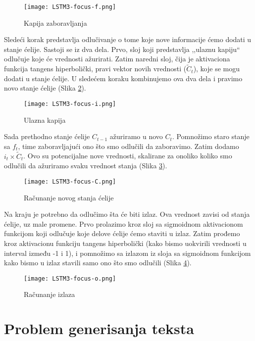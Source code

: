 \documentclass[a4paper]{article}
\begin{document}
\begin{figure}[htp]
    \centering
    \texttt{[image: LSTM3-focus-f.png]}
    \caption{Kapija zaboravljanja}
    \label{fig:lstm6}
\end{figure}

Sledeći korak predstavlja odlučivanje o tome koje nove informacije ćemo dodati u stanje ćelije. Sastoji se iz dva dela. Prvo, sloj koji predstavlja ,,ulaznu kapiju`` odlučuje koje će vrednosti ažurirati. Zatim naredni sloj, čija je aktivaciona funkcija tangens hiperbolički, pravi vektor novih vrednosti ($\tilde{C}_t$), koje se mogu dodati u stanje ćelije. U sledećem koraku kombinujemo ova dva dela i pravimo novo stanje ćelije (Slika \ref{fig:lstm7}).

\begin{figure}[htp]
    \centering
    \texttt{[image: LSTM3-focus-i.png]}
    \caption{Ulazna kapija}
    \label{fig:lstm7}
\end{figure}


Sada prethodno stanje ćelije $C_{t-1}$ ažuriramo u novo $C_t$.  Pomnožimo staro stanje sa $f_t$, time zaboravljajući ono što smo odlučili da zaboravimo. Zatim dodamo $i_t \times \tilde{C}_t$. Ovo su potencijalne nove vrednosti, skalirane za onoliko koliko smo odlučili da ažuriramo svaku vrednost stanja (Slika \ref{fig:lstm8}). 

\begin{figure}[htp]
    \centering
    \texttt{[image: LSTM3-focus-C.png]}
    \caption{Računanje novog stanja ćelije}
    \label{fig:lstm8}
\end{figure}


Na kraju je potrebno da odlučimo šta će biti izlaz. Ova vrednost zavisi od stanja ćelije, uz male promene. Prvo prolazimo kroz sloj sa sigmoidnom aktivacionom funkcijom koji odlučuje koje delove ćelije ćemo staviti u izlaz. Zatim prođemo kroz aktivacionu funkciju tangens hiperbolički (kako bismo uokvirili vrednosti u interval između -1 i 1), i pomnožimo sa izlazom iz sloja sa sigmoidnom funkcijom kako bismo u izlaz stavili samo ono što smo odlučili (Slika \ref{fig:lstm9}).

\begin{figure}[htp]
    \centering
    \texttt{[image: LSTM3-focus-o.png]}
    \caption{Računanje izlaza}
    \label{fig:lstm9}
\end{figure}



\section{Problem generisanja teksta}
\end{document}
